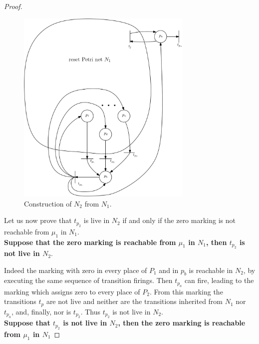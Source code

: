 \documentclass[runningheads]{llncs}
\begin{document}
\begin{proof}
 \begin{center}
	\begin{figure}
\includegraphics[width=0.75\textwidth]{FigurePN}
\caption{Construction of $N_2$ from $N_1$.}
	\end{figure}
\end{center}

Let us now prove that $t_{p_2}$ is live in $N_2$ if and only if 
the zero marking
is not reachable from $\mu_1$ in $N_1$. \\


{\bf Suppose that the zero marking is reachable from $\mu_1$ in $N_1$, then $t_{p_2}$ is not live in $N_2$}.

Indeed the marking with zero in every place of $P_1$ and in $p_b$ is reachable in $N_2$, by executing the same sequence of transition firings. Then $t_{p_a}$ can fire, leading to the marking which assigns zero to every place of $P_2$. From this marking the transitions $t_p$ are not live and neither are the transitions inherited from $N_1$ nor $t_{p_a}$, and, finally, nor is $t_{p_2}$. Thus $t_{p_2}$ is not live in $N_2$. \\


{\bf Suppose that $t_{p_2}$ is not live in $N_2$, then the zero marking is reachable from $\mu_1$ in $N_1$}


\end{proof}
\end{document}

